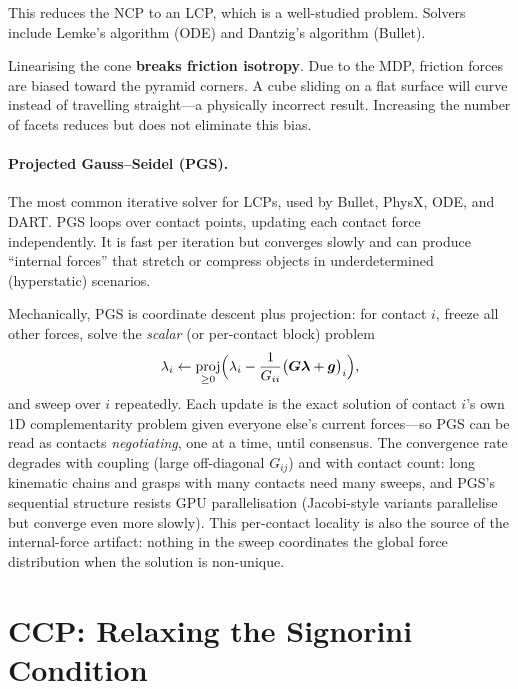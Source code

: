 \documentclass[11pt,twoside]{report}
\theoremstyle{definition}
\theoremstyle{plain}
\theoremstyle{remark}
\newcommand{\0}{\bm{0}}
\DeclareMathOperator{\proj}{proj}
\begin{document}
This reduces the NCP to an LCP, which is a well-studied problem.
Solvers include Lemke's algorithm (ODE) and Dantzig's algorithm (Bullet).

\begin{warningbox}
Linearising the cone \textbf{breaks friction isotropy}.
Due to the MDP, friction forces are biased toward the pyramid
corners.  A cube sliding on a flat surface will curve instead of
travelling straight---a physically incorrect result.
Increasing the number of facets reduces but does not eliminate this bias.
\end{warningbox}

\paragraph{Projected Gauss--Seidel (PGS).}
The most common iterative solver for LCPs, used by Bullet, PhysX, ODE,
and DART.  PGS loops over contact points, updating each contact force
independently.  It is fast per iteration but converges slowly and can
produce ``internal forces'' that stretch or compress objects in
underdetermined (hyperstatic) scenarios.

Mechanically, PGS is coordinate descent plus projection: for contact
$i$, freeze all other forces, solve the \emph{scalar} (or per-contact
block) problem
\begin{equation}
\lambda_{i}\leftarrow
\proj_{\ge 0}\Bigl(\lambda_{i}
-\frac{1}{G_{ii}}\bigl(\bm{G}\bm{\lambda}+\bm{g}\bigr)_{i}\Bigr),
\end{equation}
and sweep over $i$ repeatedly. Each update is the exact solution of
contact $i$'s own 1D complementarity problem given everyone else's
current forces---so PGS can be read as contacts \emph{negotiating}, one
at a time, until consensus. The convergence rate degrades with coupling
(large off-diagonal $G_{ij}$) and with contact count: long kinematic
chains and grasps with many contacts need many sweeps, and PGS's
sequential structure resists GPU parallelisation
(Jacobi-style variants parallelise but converge even more slowly).
This per-contact locality is also the source of the internal-force
artifact: nothing in the sweep coordinates the global force
distribution when the solution is non-unique.

\section{CCP: Relaxing the Signorini Condition}
\label{sec:ccp}
\end{document}
